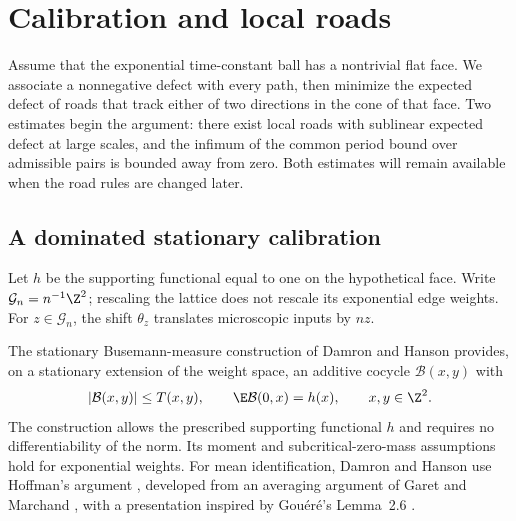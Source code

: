 \section{Calibration and local roads}\label{sec:roads}

Assume that the exponential time-constant ball has a nontrivial flat
face.  We associate a nonnegative defect with every path, then minimize
the expected defect of roads that track either of two directions in
the cone of that face.  Two estimates begin the argument: there exist
local roads with sublinear expected defect at large scales, and the
infimum of the common period bound over admissible pairs is bounded
away from zero.  Both estimates will remain available when the road
rules are changed later.

\subsection{A dominated stationary calibration}
\label{sec:fb-calibration}

Let $h$ be the supporting functional equal to one on the hypothetical
face.  Write $\mathcal G_n=n^{-1}\Z^2$; rescaling the lattice
does not rescale its exponential edge weights.  For $z\in\mathcal G_n$,
the shift $\theta_z$ translates microscopic inputs by $nz$.

The stationary Busemann-measure construction of Damron and Hanson
\cite[Section~3, Propositions~3.2 and~3.4, and Theorem~3.5]{DH2014}
provides, on a stationary extension of the weight space, an additive
cocycle $\mathcal B(x,y)$ with
\[
 |\mathcal B(x,y)|\le T(x,y),\qquad
 \E \mathcal B(0,x)=h(x),\qquad x,y\in\Z^2.
\]
The construction allows the prescribed supporting functional $h$ and
requires no differentiability of the norm.  Its moment and
subcritical-zero-mass assumptions hold for exponential weights.
For mean identification, Damron and Hanson use Hoffman's argument
\cite{Hoffman2008}, developed from an averaging argument of Garet and
Marchand \cite{GaretMarchand2005}, with a presentation inspired by
Gou\'er\'e's Lemma~2.6 \cite{Gouere2007}.

